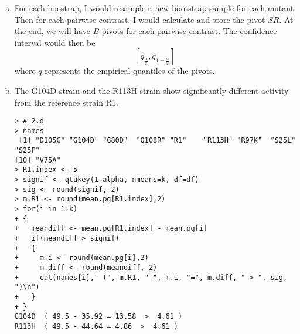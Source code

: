 \documentclass[a4paper, 10pt]{article}
\begin{document}
\begin{enumerate}[(a)]
\begin{verbatim}
> # 2.b Compute CIs with Tukey method
> # Grab df, Sp from ANOVA table
> anova <- aov(pg ~ Mutant, data=rev)
> summary(anova)
            Df Sum Sq Mean Sq F value    Pr(>F)    
Mutant       9  31668  3518.6  22.143 < 2.2e-16 ***
Residuals   77  12235   158.9                      
---
Signif. codes:  0 '***' 0.001 '**' 0.01 '*' 0.05 '.' 0.1 ' ' 1
> # Do Tukey CIs
> names <- sort(as.vector(unique(rev$Mutant)))
> n.pg <- as.vector(tapply(rev$pg, rev$Mutant, length))
> df <- 77
> k <- 10
> s.pool <- sqrt(158.9)
> alpha <- 0.05
> results <- matrix(ncol=6, nrow=45)
> row = 1
> for(i in 1:(k-1))
+ {
+   for(j in (i+1):k)
+   {
+     results[row, 1] <- names[i]
+     results[row, 2] <- names[j]
+     results[row, 3] <- round((mean.pg[i] - mean.pg[j]) -
+         qtukey(1-alpha, nmeans=k, df=df)*s.pool*sqrt((1/n.pg[i])+(1/n.pg[j]))
+         /sqrt(2), 4)
+     results[row, 4] <- round((mean.pg[i] - mean.pg[j]) +
+         qtukey(1-alpha, nmeans=k, df=df)*s.pool*sqrt((1/n.pg[i])+(1/n.pg[j]))
+         /sqrt(2), 4)
+     t.confint <- t.test(rev$pg[rev$Mutant == names[i]],
+         rev$pg[rev$Mutant == names[j]])$conf.int
+     results[row, 5] <- round(t.confint[1], 4)
+     results[row, 6] <- round(t.confint[2], 4)
+     row <- row+1
+   }
+ }
> head(results)
     [,1]    [,2]    [,3]       [,4]      [,5]       [,6]      
[1,] "D105G" "G104D" "15.2083"  "58.5017" "27.7457"  "45.9643" 
[2,] "D105G" "G80D"  "-45.5306" "-4.1341" "-49.0253" "-0.6394" 
[3,] "D105G" "Q108R" "-50.0234" "-6.7299" "-38.5986" "-18.1547"
[4,] "D105G" "R1"    "6.909"    "39.6358" "15.057"   "31.4878" 
[5,] "D105G" "R113H" "0.7555"   "55.5179" "18.6047"  "37.6687" 
[6,] "D105G" "R97K"  "0.0175"   "38.7403" "9.9902"   "28.7675"\
\end{verbatim}

\item For each boostrap, I would resample a new bootstrap sample for each mutant. Then for each pairwise contrast, I would calculate and store the pivot $SR$. At the end, we will have $B$ pivots for each pairwise contrast. The confidence interval would then be \[ [q_{\frac{\alpha}{2}}, q_{1-\frac{\alpha}{2}}] \] where $q$ represents the empirical quantiles of the pivots.

\item The G104D strain and the R113H strain show significantly different activity from the reference strain R1.

\begin{verbatim}
> # 2.d
> names
 [1] "D105G" "G104D" "G80D"  "Q108R" "R1"    "R113H" "R97K"  "S25L"  "S25P" 
[10] "V75A" 
> R1.index <- 5
> signif <- qtukey(1-alpha, nmeans=k, df=df)
> sig <- round(signif, 2)
> m.R1 <- round(mean.pg[R1.index],2)
> for(i in 1:k)
+ {
+   meandiff <- mean.pg[R1.index] - mean.pg[i]
+   if(meandiff > signif)
+   {
+     m.i <- round(mean.pg[i],2)
+     m.diff <- round(meandiff, 2)
+     cat(names[i]," (", m.R1, "-", m.i, "=", m.diff, " > ", sig, ")\n")
+   }
+ }
G104D  ( 49.5 - 35.92 = 13.58  >  4.61 )
R113H  ( 49.5 - 44.64 = 4.86  >  4.61 )
\end{verbatim}

\end{enumerate}
\end{document}
